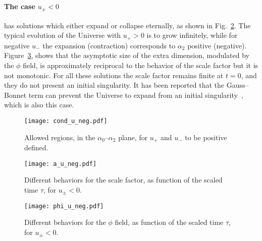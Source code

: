 \documentclass[aps,prd,12pt,superscriptaddress,showpacs,showkeys,longbibliography,reprint,nofootinbib]{revtex4-1}
\begin{document}
\paragraph{The case $u_\pm < 0$} has solutions which either expand or collapse eternally, as shown in Fig.~\ref{a_u_neg}. The typical evolution of the Universe with $u_+ > 0$ is to grow infinitely, while for negative $u_-$ the expansion (contraction) corresponds to $\alpha_2$ positive (negative). Figure~\ref{phi_u_neg}, shows that the asymptotic {size} of the extra dimension, modulated by the $\phi$ field, is approximately reciprocal to the behavior of the scale factor but it is not monotonic.
For all these solutions the scale factor remains finite at $t = 0$, and they do not present an initial singularity. It has been reported that the Gauss--Bonnet term can prevent the Universe to expand from an initial singularity~\cite{Deruelle:1986iv,Henriques:1986jw,Ishihara:1986if}, which is also this case.

\begin{figure}[H]
  \texttt{[image: cond\_u\_neg.pdf]}
  \caption{Allowed regions, in the $\alpha_0$--$\alpha_2$ plane, for $u_+$ and $u_-$ to be positive defined.}
  \label{cond_u_neg}  
\end{figure}

\begin{figure}[H]
  \texttt{[image: a\_u\_neg.pdf]}
  \caption{Different behaviors for the scale factor, as function of the scaled time $\tau$, for $u_\pm < 0$.}
  \label{a_u_neg}
\end{figure}

\begin{figure}[H]
  \texttt{[image: phi\_u\_neg.pdf]}
  \caption{Different behaviors for the $\phi$ field, as function of the scaled time $\tau$, for $u_\pm < 0$.}
  \label{phi_u_neg}
\end{figure}
\end{document}
